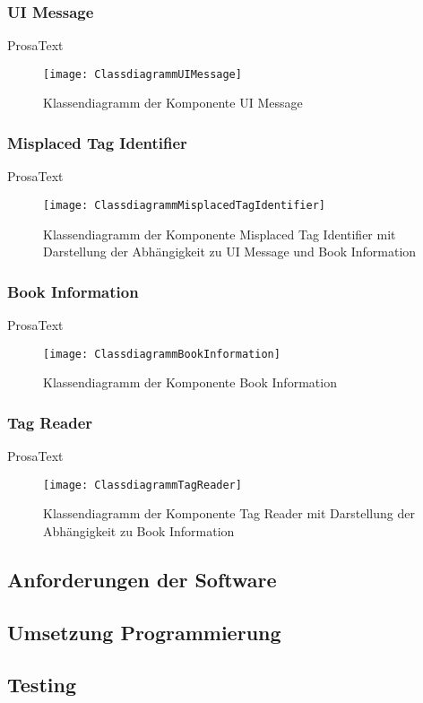 \subsubsection{UI Message}
ProsaText
\begin{figure}[htb]
	\centering
	\texttt{[image: ClassdiagrammUIMessage]}
	\caption{Klassendiagramm der Komponente UI Message}
	\label{fig:ClassUIMessage}
\end{figure}

\subsubsection{Misplaced Tag Identifier}
ProsaText
\begin{figure}[htb]
	\centering
	\texttt{[image: ClassdiagrammMisplacedTagIdentifier]}
	\caption{Klassendiagramm der Komponente Misplaced Tag Identifier mit Darstellung der Abhängigkeit zu UI Message und Book Information}
	\label{fig:ClassMisplacedTagIdentifier}
\end{figure}

\subsubsection{Book Information}
ProsaText
\begin{figure}[htb]
	\centering
	\texttt{[image: ClassdiagrammBookInformation]}
	\caption{Klassendiagramm der Komponente Book Information}
	\label{fig:ClassBookInformation}
\end{figure}

\subsubsection{Tag Reader}
ProsaText
\begin{figure}[htb]
	\centering
	\texttt{[image: ClassdiagrammTagReader]}
	\caption{Klassendiagramm der Komponente Tag Reader mit Darstellung der Abhängigkeit zu Book Information}
	\label{fig:ClassTagReader}
\end{figure}

\clearpage

\subsection{Anforderungen der Software}

\subsection{Umsetzung Programmierung}

\subsection{Testing}
